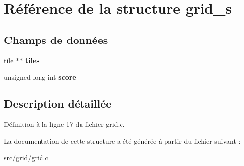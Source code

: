 \hypertarget{structgrid__s}{
\section{Référence de la structure grid\_\-s}
\label{structgrid__s}
}
\subsection*{Champs de données}
\begin{DoxyCompactItemize}
\item 
\hypertarget{structgrid__s_a9edca85e2c4d7cf999df0ba2207200f0}{
\hyperlink{grid_8h_a9a1fe03e260de47d12663efab5b0eec0}{tile} $\ast$$\ast$ {\bfseries tiles}}
\label{structgrid__s_a9edca85e2c4d7cf999df0ba2207200f0}

\item 
\hypertarget{structgrid__s_afa23aef9d235eb9bd53c89f1a5179645}{
unsigned long int {\bfseries score}}
\label{structgrid__s_afa23aef9d235eb9bd53c89f1a5179645}

\end{DoxyCompactItemize}


\subsection{Description détaillée}


Définition à la ligne 17 du fichier grid.c.



La documentation de cette structure a été générée à partir du fichier suivant :\begin{DoxyCompactItemize}
\item 
src/grid/\hyperlink{grid_8c}{grid.c}\end{DoxyCompactItemize}
